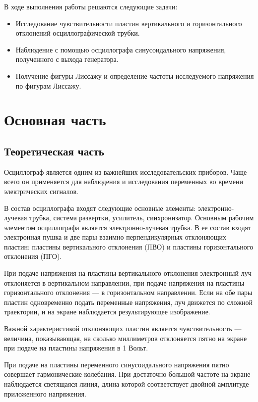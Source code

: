 \documentclass[a4paper,14pt]{extarticle}
\theoremstyle{plain}
\theoremstyle{remark}
\theoremstyle{definition}
\begin{document}
В ходе выполнения работы решаются следующие задачи:


\begin{itemize}
\item Исследование чувствительности пластин вертикального и горизонтального
отклонений осциллографической трубки.
\item Наблюдение с помощью осциллографа синусоидального напряжения, полученного с
выхода генератора.
\item Получение фигуры Лиссажу и определение частоты исследуемого напряжения по
фигурам Лиссажу.
\end{itemize}

\newpage

\section{Основная часть}

\subsection{Теоретическая часть}
Осциллограф является одним из важнейших исследовательских приборов. Чаще всего он применяется для наблюдения и исследования переменных во времени электрических сигналов.

В состав осциллографа входят следующие основные элементы: электронно-лучевая трубка, система развертки, усилитель, синхронизатор. Основным рабочим элементом осциллографа является электронно-лучевая трубка. В ее состав входят электронная пушка и две пары взаимно перпендикулярных отклоняющих пластин: пластины вертикального отклонения (ПВО) и пластины горизонтального отклонения (ПГО).

При подаче напряжения на пластины вертикального отклонения электронный луч отклоняется в вертикальном направлении, при подаче напряжения на пластины горизонтального отклонения — в горизонтальном направлении. Если на обе пары пластин одновременно подать переменные напряжения, луч движется по сложной траектории, и на экране наблюдается результирующее изображение.

Важной характеристикой отклоняющих пластин является чувствительность — величина, показывающая, на сколько миллиметров отклоняется пятно на экране при подаче на пластины напряжения в 1 Вольт.

При подаче на пластины переменного синусоидального напряжения пятно совершает гармонические колебания. При достаточно большой частоте на экране наблюдается светящаяся линия, длина которой соответствует двойной амплитуде приложенного напряжения.
\end{document}
